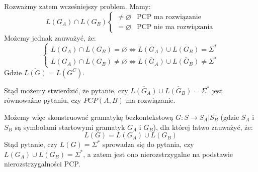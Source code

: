 \documentclass[12pt]{article}
\begin{document}
    \noindent \newline

    \noindent Rozważmy zatem wcześniejszy problem. Mamy:
    $$
    L(G_A) \cap L(G_B)
    \begin{cases}
        \ne \varnothing & \text{PCP ma rozwiązanie} \\
        = \varnothing & \text{PCP nie ma rozwiązania}
    \end{cases}
    $$
    \noindent Możemy jednak zauważyć, że:
    \begin{equation*}
        \left
        \lbrace
        \begin{array}{l}
            L(G_A) \cap L(G_B) = \varnothing \iff \overline{L(G_A)} \cup \overline{L(G_B)} = \Sigma^\ast \\
            L(G_A) \cap L(G_B) \ne \varnothing \iff \overline{L(G_A)} \cup \overline{L(G_B)} \ne \Sigma^\ast
        \end{array}
        \right.
    \end{equation*}
    \noindent Gdzie $\overline{L(G)} = L(G^C)$.

    \newpage

    \noindent Stąd możemy stwierdzić, że pytanie, czy $\overline{L(G_A)} \cup \overline{L(G_B)} = \Sigma^\ast$ jest równoważne pytaniu, czy $PCP(A, B)$ ma rozwiązanie.

    \noindent \newline

    \noindent Możemy więc skonstruować gramatykę bezkontekstową $G : S \rightarrow S_A|S_B$ (gdzie $S_A$ i $S_B$ są symbolami startowymi gramatyk $G_A$ i $G_B$), dla której łatwo zauważyć, że:
    $$L(G) = L(G_A) \cup L(G_B)$$
    \noindent Stąd pytanie, czy $L(G) = \Sigma^\ast$ sprowadza się do pytania, czy $L(G_A) \cup L(G_B) = \Sigma^\ast$, a zatem jest ono nierozstrzygalne na podstawie nierozstrzygalności PCP. \qedsymbol
\end{document}
